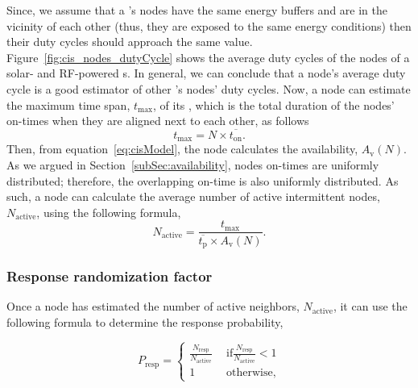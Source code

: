 Since, we assume that a \cis's nodes have the same energy buffers and are in the vicinity of each other (thus, they are exposed to the same energy conditions) then their duty cycles should approach the same value. 
Figure~\ref{fig:cis_nodes_dutyCycle} shows the average duty cycles of the nodes of a solar- and RF-powered \cis{}s. In general, we can conclude that a node's average duty cycle is a good estimator of other \cis's nodes' duty cycles.
Now, a node can estimate the maximum time span, $t_\text{max}$, of its \cis, which is the total duration of the nodes' on-times when they are aligned next to each other, as follows
\begin{equation}
t_\text{max} = N\times \overline{t_\text{on}}.
		\label{eq:max_time}
\end{equation}
Then, from equation~\ref{eq:cisModel}, the node calculates the \cis availability, $A_\text{v}(N)$. As we argued in Section~\ref{subSec:availability}, nodes on-times are uniformly distributed; therefore, the overlapping on-time is also uniformly distributed. As such, a node can calculate the average number of active intermittent nodes, $N_\text{active}$, using the following formula,
\begin{equation}
	N_\text{active} = \frac{t_\text{max}}{\overline{t_\text{p}}\times A_\text{v}(N)}.
	\label{eq:active}
\end{equation}

\subsubsection{Response randomization factor}

Once a node has estimated the number of active neighbors, $N_\text{active}$, it can use the following formula to determine the response probability,  

\begin{equation}
	P_\text{resp} = 
	\begin{cases}
		\frac{N_\text{resp}}{N_\text{active}} & \ \  \text{if} \frac{N_\text{resp}}{N_\text{active}} < 1\\
		1 									  & \ \ \text{otherwise},
	\end{cases}
	\label{eq:randFactor}
\end{equation}

